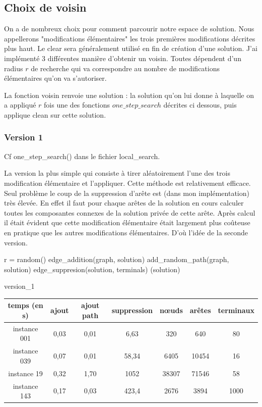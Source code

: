 \documentclass[10pt,a4paper]{article}
\begin{document}
\subsection{Choix de voisin}

On a de nombreux choix pour comment parcourir notre espace de solution. Nous appellerons "modifications élémentaires" les trois premières modifications décrites plus haut. Le clear sera généralement utilisé en fin de création d'une solution. J'ai implémenté 3 différentes manière d'obtenir un voisin. Toutes dépendent d'un radius $ r$ de recherche qui va correspondre au nombre de modifications élémentaires qu'on va s'autoriser. 

La fonction voisin renvoie une solution : la solution qu'on lui donne à laquelle on a appliqué $r$ fois une des fonctions $one\_step\_search$ décrites ci dessous, puis applique clean sur cette solution.

\subsubsection{Version 1}

Cf one\_step\_search() dans le fichier local\_search.

La version la plus simple qui consiste à tirer aléatoirement l'une des trois modification élémentaire et l'appliquer. Cette méthode est relativement efficace. Seul problème le coup de la suppression d'arête est (dans mon implémentation) très élevée. En effet il faut pour chaque arêtes de la solution en cours calculer toutes les composantes connexes de la solution privée de cette arête. Après calcul il était évident que cette modification élémentaire était largement plus coûteuse en pratique que les autres modifications élémentaires. D’où l'idée de la seconde version.

\begin{algorithm}[H]
\SetAlgoLined
{}
r = random()\;
{
	edge\_addition(graph, solution)\;
}
{
	add\_random\_path(graph, solution)\;
}
{
	edge\_suppresion(solution, terminals)\;
}
\Return(solution)\;
\caption{version\_1}
\end{algorithm}


\begin{tabular}{|c|c|c|c|c|c|c|}
\hline 
temps (en s) & ajout & ajout path & suppression & nœuds & arêtes & terminaux  \\ 
\hline 
instance 001 & 0,03 & 0,01 & 6,63 & 320 & 640 & 80 \\ 
\hline 
instance 039 & 0,07 & 0,01 & 58,34 & 6405 & 10454 & 16 \\ 
\hline 
instance  19 & 0,32 & 1,70 & 1052 & 38307 & 71546 & 58 \\
\hline 
instance  143 & 0,17 & 0,03 & 423,4 & 2676 & 3894 & 1000 \\ 
\hline 
\end{tabular} 
\end{document}
